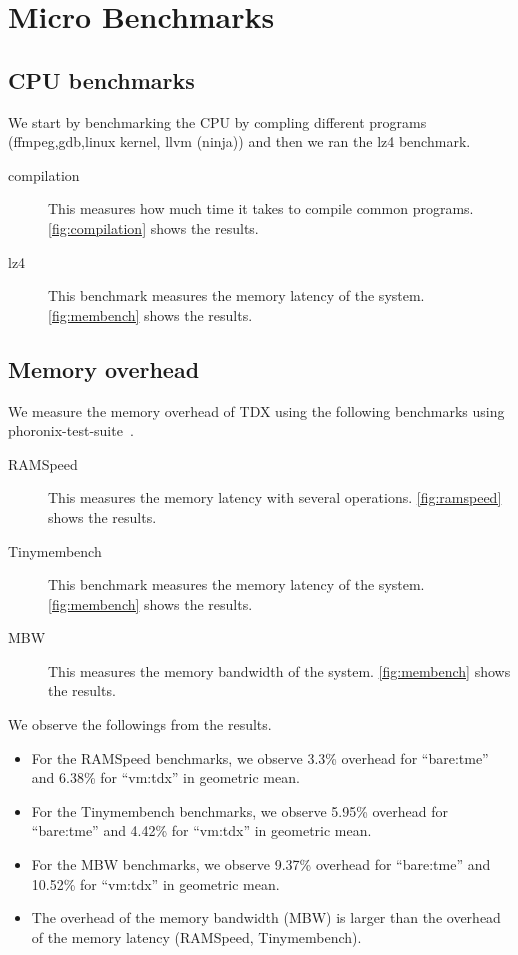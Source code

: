 \documentclass[letterpaper,twocolumn,10pt]{article}
\begin{document}
\section{Micro Benchmarks}

\subsection {CPU benchmarks}
We start by benchmarking the CPU by compling different programs (ffmpeg,gdb,linux kernel, llvm (ninja)) and then we ran the lz4 benchmark.

\begin{description}
    \item[compilation~\cite{compilation}] This measures how much time it takes to compile common programs. \autoref{fig:compilation} shows the results.
    \item[lz4~\cite{lz4}] This benchmark measures the memory latency of the system. \autoref{fig:membench} shows the results.
    \end{description}




\subsection{Memory overhead}
We measure the memory overhead of TDX using the following benchmarks using phoronix-test-suite~\cite{phoronix}.

\begin{description}

\item[RAMSpeed~\cite{ramspeed}] This measures the memory latency with several operations. \autoref{fig:ramspeed} shows the results.
\item[Tinymembench~\cite{tinymembench}] This benchmark measures the memory latency of the system. \autoref{fig:membench} shows the results.
\item[MBW~\cite{mbw}] This measures the memory bandwidth of the system. \autoref{fig:membench} shows the results.
\end{description}


We observe the followings from the results.
\begin{itemize}
    \item For the RAMSpeed benchmarks, we observe 3.3\% overhead for ``bare:tme'' and 6.38\% for ``vm:tdx'' in geometric mean.
    \item For the Tinymembench benchmarks, we observe 5.95\% overhead for ``bare:tme'' and 4.42\% for ``vm:tdx'' in geometric mean.
    \item For the MBW benchmarks, we observe 9.37\% overhead for ``bare:tme'' and 10.52\% for ``vm:tdx'' in geometric mean.
    \item The overhead of the memory bandwidth (MBW) is larger than the overhead of the memory latency (RAMSpeed, Tinymembench).
\end{itemize}
\end{document}
